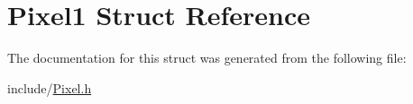 \hypertarget{structPixel1}{}\section{Pixel1 Struct Reference}
\label{structPixel1}


The documentation for this struct was generated from the following file\+:\begin{DoxyCompactItemize}
\item 
include/\hyperlink{Pixel_8h}{Pixel.\+h}\end{DoxyCompactItemize}
